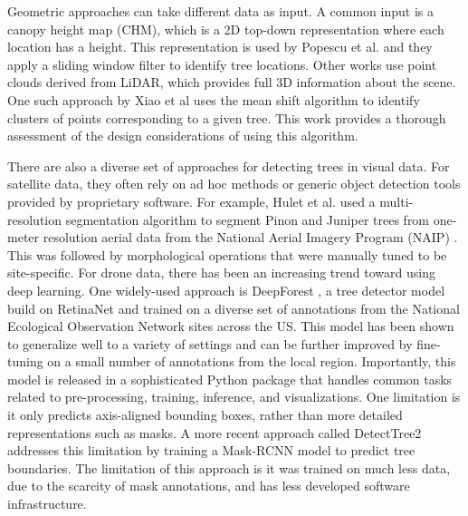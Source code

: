 Geometric approaches can take different data as input. A common input is a canopy height map (CHM), which is a 2D top-down representation where each location has a height. This representation is used by Popescu et al. \cite{Popescu2004SeeingHeight} and they apply a sliding window filter to identify tree locations. Other works use point clouds derived from LiDAR, which provides full 3D information about the scene. One such approach by Xiao et al \cite{Xiao2019MeanData} uses the mean shift algorithm to identify clusters of points corresponding to a given tree. This work provides a thorough assessment of the design considerations of using this algorithm.

There are also a diverse set of approaches for detecting trees in visual data. For satellite data, they often rely on ad hoc methods or generic object detection tools provided by proprietary software. 
For example, Hulet et al. \cite{Hulet2014UtilizingWoodlands} used a multi-resolution segmentation algorithm \cite{Baatz2000MultiresolutionS} to segment Pinon and Juniper trees from one-meter resolution aerial data from the National Aerial Imagery Program (NAIP) \cite{U.S.DepartmentofAgriculture2011NationalSheet}. This was followed by morphological operations that were manually tuned to be site-specific.
For drone data, there has been an increasing trend toward using deep learning. One widely-used approach is DeepForest \cite{Weinstein2020DeepForest:Delineation}, a tree detector model build on RetinaNet \cite{Lin2020FocalDetection} and trained on
a diverse set of annotations from the National Ecological Observation Network sites
\cite{Keller2008ANetwork} across the US. This model has been shown to generalize well to a variety of settings and can be further improved by fine-tuning on a small number of annotations from the local region. Importantly, this model is released in a sophisticated Python package that handles common tasks related to pre-processing, training, inference, and visualizations. One limitation is it only predicts axis-aligned bounding boxes, rather than more detailed representations such as masks. A more recent approach called DetectTree2 \cite{DetectTree2} addresses this limitation by training a Mask-RCNN \cite{He2017MaskR-CNN} model to predict tree boundaries. The limitation of this approach is it was trained on much less data, due to the scarcity of mask annotations, and has less developed software infrastructure.

